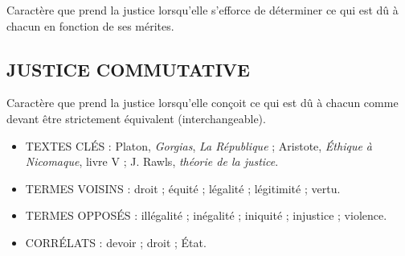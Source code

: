 Caractère que prend la justice lorsqu'elle
s'efforce de déterminer ce qui est dû à
chacun en fonction de ses mérites.

\subsection{JUSTICE COMMUTATIVE}

Caractère que prend la justice lorsqu'elle
conçoit ce qui est dû à chacun comme
devant être strictement équivalent (interchangeable).


\begin{itemize}[leftmargin=1cm, label=, itemsep=1pt]
\item {\footnotesize TEXTES CLÉS} : Platon, {\it Gorgias}, {\it La République} ; Aristote, {\it Éthique à
Nicomaque}, livre V ; J. Rawls, {\it théorie de la justice}.
\item {\footnotesize TERMES VOISINS} : droit ; équité ; légalité ; légitimité ; vertu.
\item {\footnotesize TERMES OPPOSÉS} : illégalité ; inégalité ; iniquité ; injustice ; violence.
\item {\footnotesize CORRÉLATS} : devoir ; droit ; État.
\end{itemize}

